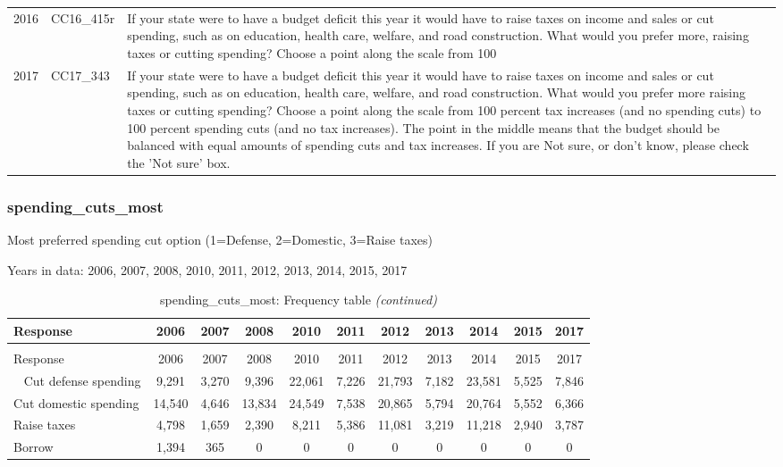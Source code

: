 \documentclass[12pt]{article}
\begin{document}
\begin{longtable}[t]{rl>{\raggedright\arraybackslash}p{10cm}}
2016 & CC16\_415r & If your state were to have a budget deficit this year it would have to raise taxes on income and sales or cut spending, such as on education, health care, welfare, and road construction. What would you prefer more, raising taxes or cutting spending? Choose a point along the scale from 100\\
2017 & CC17\_343 & If your state were to have a budget deficit this year it would have to raise taxes on income and sales or cut spending, such as on education, health care, welfare, and road construction. What would you prefer more raising taxes or cutting spending? Choose a point along the scale from 100 percent tax increases (and no spending cuts) to 100 percent spending cuts (and no tax increases). The point in the middle means that the budget should be balanced with equal amounts of spending cuts and tax increases. If you are Not sure, or don't know, please check the 'Not sure' box.\\*
\end{longtable}

\subsubsection{spending\_cuts\_most}\label{spending_cuts_most}

Most preferred spending cut option (1=Defense, 2=Domestic, 3=Raise
taxes)

Years in data: 2006, 2007, 2008, 2010, 2011, 2012, 2013, 2014, 2015,
2017\begingroup\fontsize{10}{12}\selectfont

\begin{longtable}[t]{lcccccccccc}
\caption{\label{tab:unnamed-chunk-4}spending\_cuts\_most: Frequency table}\\
\toprule
Response & 2006 & 2007 & 2008 & 2010 & 2011 & 2012 & 2013 & 2014 & 2015 & 2017\\
\midrule
\endfirsthead
\caption[]{spending\_cuts\_most: Frequency table \textit{(continued)}}\\
\toprule
Response & 2006 & 2007 & 2008 & 2010 & 2011 & 2012 & 2013 & 2014 & 2015 & 2017\\
\midrule
\endhead
\
\endfoot
\bottomrule
\endlastfoot
Cut defense spending & 9,291 & 3,270 & 9,396 & 22,061 & 7,226 & 21,793 & 7,182 & 23,581 & 5,525 & 7,846\\
Cut domestic spending & 14,540 & 4,646 & 13,834 & 24,549 & 7,538 & 20,865 & 5,794 & 20,764 & 5,552 & 6,366\\
Raise taxes & 4,798 & 1,659 & 2,390 & 8,211 & 5,386 & 11,081 & 3,219 & 11,218 & 2,940 & 3,787\\
Borrow & 1,394 & 365 & 0 & 0 & 0 & 0 & 0 & 0 & 0 & 0\\*
\end{longtable}
\end{document}
